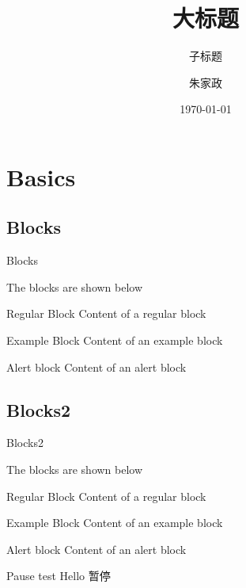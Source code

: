 \documentclass[10pt,aspectratio=169]{beamer} %
\title{大标题}
\subtitle{子标题}   %
\author[JiaZheng Zhu]{朱家政}
\institute[Chang'an University]{\large 地球科学与资源学院 \\School of Geosciences \& Resources}
\date{\today}
\begin{document}
\maketitle

\section{Basics}
\subsection{Blocks}
\begin{frame}[c]{Blocks}

	The blocks are shown below
	\begin{block}{Regular Block}
		Content of a regular block
	\end{block}

	\begin{exampleblock}{Example Block}
		Content of an example block
	\end{exampleblock}

	\begin{alertblock}{Alert block}
		Content of an alert block
	\end{alertblock}

\end{frame}
\subsection{Blocks2}
\begin{frame}[c]{Blocks2}
	
	The blocks are shown below
	\begin{block}{Regular Block}
		Content of a regular block
	\end{block}
	
	\begin{exampleblock}{Example Block}
		Content of an example block
	\end{exampleblock}
	
	\begin{alertblock}{Alert block}
		Content of an alert block
	\end{alertblock}
	
\end{frame}
\begin{frame}{Pause test}
	\pause
	Hello
	\pause[3]
	暂停
\end{frame}
\end{document}
